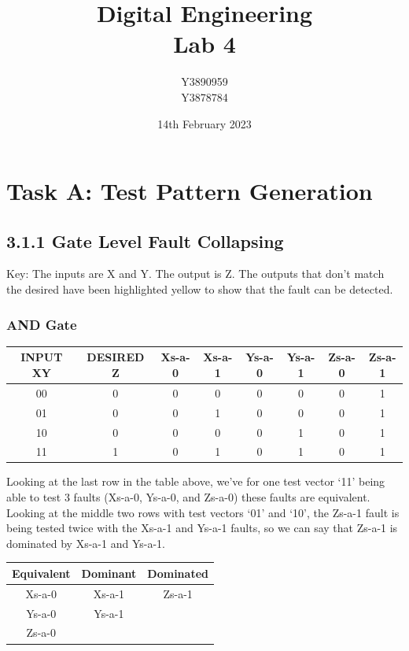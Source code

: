\documentclass[11pt]{report}
\title{Digital Engineering\\Lab 4}
\author{Y3890959\\Y3878784}
\date{14th February 2023}
\begin{document}
\maketitle

\chapter*{Task A: Test Pattern Generation}

\section*{3.1.1 Gate Level Fault Collapsing}
Key: The inputs are X and Y. The output is Z. The outputs that don't match the desired have been highlighted yellow to show that the fault can be detected.

\subsection*{AND Gate}
\begin{tabular}{ |c|c|c|c|c|c|c|c| }
\hline
INPUT XY & DESIRED Z & Xs-a-0 & Xs-a-1 & Ys-a-0 & Ys-a-1 & Zs-a-0 & Zs-a-1
\\ 
\hline
\hline
00 & 0 & 0 & 0 & 0 & 0 & 0 & \cellcolor{yellow!50}1
\\  
\hline
01 & 0 & 0 & \cellcolor{yellow!50}1 & 0 & 0 & 0 & \cellcolor{yellow!50}1
\\
\hline
10 & 0 & 0 & 0 & 0 & \cellcolor{yellow!50}1 & 0 & \cellcolor{yellow!50}1
\\
\hline
11 & 1 & \cellcolor{yellow!50}0 & 1 & \cellcolor{yellow!50}0 & 1 & \cellcolor{yellow!50}0 & 1
\\
\hline
\end{tabular}

Looking at the last row in the table above, we've for one test vector `11' being able to test 3 faults (Xs-a-0, Ys-a-0, and Zs-a-0) these faults are equivalent.
Looking at the middle two rows with test vectors `01' and `10', the Zs-a-1 fault is being tested twice with the Xs-a-1 and Ys-a-1 faults, so we can say that Zs-a-1 is
dominated by Xs-a-1 and Ys-a-1.

\begin{tabular}{ |c|c|c| }
\hline
Equivalent & Dominant & Dominated
\\ 
\hline
\hline
Xs-a-0 & Xs-a-1 & Zs-a-1
\\  
\hline
Ys-a-0 & Ys-a-1 & 
\\
\hline
Zs-a-0 & & 
\\
\hline
\end{tabular}
\end{document}
